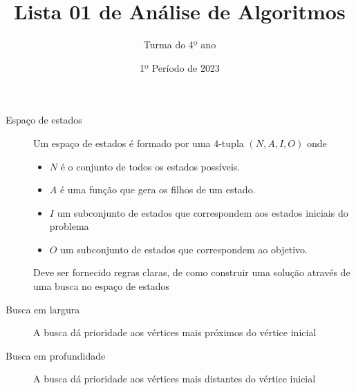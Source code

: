 \documentclass[12pt]{article}
\title{Lista 01 de Análise de Algoritmos}
\date{1º Período de 2023}
\author{Turma do 4º ano}
\begin{document}
\maketitle

\begin{description}

\item[Espaço de estados]
Um espaço de estados é formado por uma 4-tupla $(N, A, I, O)$ onde
\begin{itemize}
\item $N$ é o conjunto de todos os estados possíveis.
\item $A$ é uma função que gera os filhos de um estado.
\item $I$ um subconjunto de estados que correspondem aos estados iniciais do problema
\item $O$ um subconjunto de estados que correspondem ao objetivo.
\end{itemize}
Deve ser fornecido regras claras, de como construir uma solução através de uma busca no espaço de estados

\item[Busca em largura]
A busca dá prioridade aos vértices mais próximos do vértice inicial

\item[Busca em profundidade]
A busca dá prioridade aos vértices mais distantes do vértice inicial

\end{description}

\break
\end{document}
